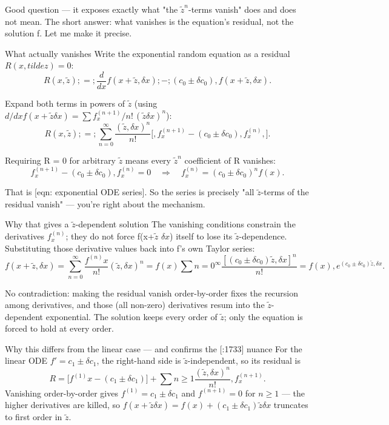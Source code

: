 \documentclass[twoside]{article}
\numberwithin{equation}{section}
\begin{document}
Good question — it exposes exactly what "the $\tilde{z}^n$-terms vanish" does and does not mean. The short answer: what vanishes is the equation's residual, not the solution f. Let me make it precise.

What actually vanishes
Write the exponential random equation as a residual $R(x, tilde{z}) = 0$:
$$R(x,\tilde z) ;=; \frac{d}{dx}f(x+\tilde z,\delta x) ;-; (c_0\pm\delta c_0),f(x+\tilde z,\delta x).$$

Expand both terms in powers of $\tilde{z}$ (using $d/dx f(x+\tilde{z} \delta x) = \sum f^{(n+1)}_x/n!\,(\tilde{z} \delta x)^n$):
$$R(x,\tilde z) ;=; \sum_{n=0}^{\infty}\frac{(\tilde z,\delta x)^n}{n!}\Big[,f^{(n+1)}_x - (c_0\pm\delta c_0),f^{(n)}_x,\Big].$$

Requiring R = 0 for arbitrary $\tilde{z}$ means every $\tilde{z}^n$ coefficient of R vanishes:
$$f^{(n+1)}_x - (c_0\pm\delta c_0),f^{(n)}_x = 0 \quad\Longrightarrow\quad f^{(n)}_x = (c_0\pm\delta c_0)^n f(x).$$

That is [eqn: exponential ODE series]. So the series is precisely "all $\tilde{z}$-terms of the residual vanish" — you're right about the mechanism.

Why that gives a $\tilde{z}$-dependent solution
The vanishing conditions constrain the derivatives $f^{(n)}_x$; they do not force f(x+$\tilde{z}$ $\delta x$) itself to lose its $\tilde{z}$-dependence. Substituting those derivative values back into f's own Taylor series:
$$f(x+\tilde z,\delta x) = \sum_{n=0}^{\infty}\frac{f^{(n)}x}{n!}(\tilde z,\delta x)^n = f(x)\sum{n=0}^{\infty}\frac{[(c_0\pm\delta c_0)\tilde z,\delta x]^n}{n!} = f(x),e^{(c_0\pm\delta c_0)\tilde z,\delta x}.$$

No contradiction: making the residual vanish order-by-order fixes the recursion among derivatives, and those (all non-zero) derivatives resum into the $\tilde{z}$-dependent exponential. The solution keeps every order of $\tilde{z}$; only the equation is forced to hold at every order.

Why this differs from the linear case — and confirms the [:1733] nuance
For the linear ODE $f' = c_1 \pm \delta c_1$, the right-hand side is $\tilde{z}$-independent, so its residual is
$$R = \big[f^{(1)}x-(c_1\pm\delta c_1)\big] + \sum{n\ge 1}\frac{(\tilde z,\delta x)^n}{n!},f^{(n+1)}_x.$$
Vanishing order-by-order gives $f^{(1)} = c_1\pm\delta c_1$ and $f^{(n+1)} = 0$ for $n \geq 1$ --- the higher derivatives are killed, so $f(x+\tilde{z} \delta x) = f(x) + (c_1\pm\delta c_1) \tilde{z} \delta x$ truncates to first order in $\tilde{z}$.
\end{document}
